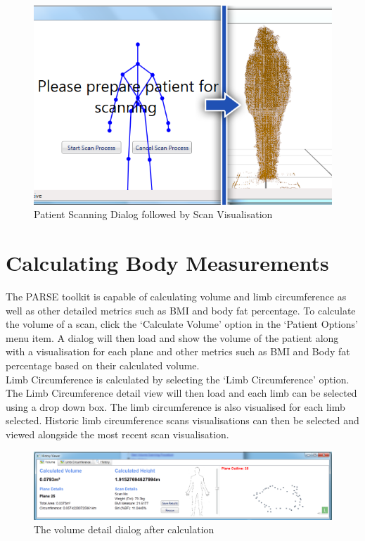 \begin{Description}
\begin{figure}[h]
\begin{center}
\includegraphics[scale=0.6]{zscreenshots/ScanViewer_Combi.png}
\end{center}
\caption{Patient Scanning Dialog followed by Scan Visualisation}
\label{combination of scanviewers}
\end{figure}

\section{Calculating Body Measurements}

The PARSE toolkit is capable of calculating volume and limb circumference as well as other detailed metrics such as BMI and body fat percentage. To calculate the volume of a scan, click the `Calculate Volume' option in the `Patient Options' menu item. A dialog will then load and show the volume of the patient along with a visualisation for each plane and other metrics such as BMI and Body fat percentage based on their calculated volume. \\

Limb Circumference is calculated by selecting the `Limb Circumference' option. The Limb Circumference detail view will then load and each limb can be selected using a drop down box. The limb circumference is also visualised for each limb selected. Historic limb circumference scans visualisations can then be selected and viewed alongside the most recent scan visualisation. \\

\begin{figure}[!h]
\begin{center}
\includegraphics[scale=0.35]{zscreenshots/voldetail.png}
\end{center}
\caption{The volume detail dialog after calculation}
\label{volume detail}
\end{figure}


\end{Description}
